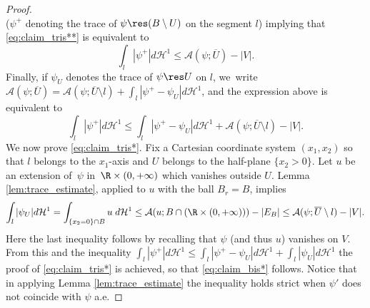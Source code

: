 \begin{proof}
\[\]
($\psi^+$ denoting the trace of $\psi\res (B\setminus U)$ on the segment $l$) implying that \eqref{eq:claim_tris**} is equivalent to
\begin{equation*}
\int_l|{\psi}^+|d\mathcal H^1
\le\mathcal{A}(\psi;\overline U)-|V|.
\end{equation*}
Finally, if $\psi_U$ denotes the trace of $\psi\res U$ on $l$, we~write $\mathcal{A}(\psi;\overline U)=\mathcal{A}(\psi;\overline U\setminus l)+\int_l|\psi^+-\psi_U|d\mathcal H^1$, and the expression above is equivalent to
\begin{equation}\label{eq:claim_tris*}
\int_l|{\psi}^+|d\mathcal H^1
\le\int_l|\psi^+-\psi_U|d\mathcal H^1+\mathcal{A}(\psi;\overline U\setminus l)-|V|.
\end{equation}
We now prove \eqref{eq:claim_tris*}.
Fix a Cartesian coordinate system $(x_1,x_2)$ so that $l$ belongs to
the $x_1$-axis and $U$ belongs to the half-plane $\{x_2>0\}$. Let $u$ be an extension of~$\psi$ in~$\R\times(0,+\infty)$ which vanishes outside $U$.
Lemma \ref{lem:trace_estimate},
applied to $u$ with the ball $B_r=B$, implies
\[
 \int_l|{\psi}_U|d\mathcal H^1=\int_{\{x_2=0\}\cap B}u \;d\mathcal H^1\leq \mathcal A(u;B\cap (\R\times (0,+\infty)))-|E_B|\leq \mathcal A(\psi;\overline U\setminus l)-|V|.
\]
Here the last inequality follows by recalling that $\psi$ (and thus $u$) vanishes on $V$.
From this and the inequality $\int_l|{\psi}^+|d\mathcal H^1\leq \int_l|\psi^+-\psi_U|d\mathcal H^1+\int_l|{\psi}_U|d\mathcal H^1
$ the proof of \eqref{eq:claim_tris*} is achieved, so that \eqref{eq:claim_bis*} follows. Notice that in applying Lemma \ref{lem:trace_estimate} the inequality holds strict when $\psi'$ does not coincide with $\psi$ a.e.


\end{proof}

